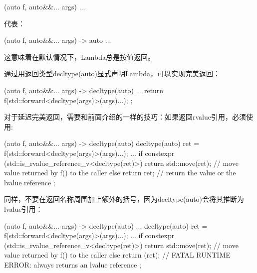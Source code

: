 \begin{cppcode}
[] (auto f, auto&&... args) {
	...
}
\end{cppcode}

代表：

\begin{cppcode}
[] (auto f, auto&&... args) -> auto {
	...
}
\end{cppcode}

这意味着在默认情况下，Lambda总是按值返回。

通过用返回类型decltype(auto)显式声明Lambda，可以实现完美返回：

\begin{cppcode}
[] (auto f, auto&&... args) -> decltype(auto) {
	...
	return f(std::forward<decltype(args)>(args)...);
};
\end{cppcode}

对于延迟完美返回，需要和前面介绍的一样的技巧：如果返回rvalue引用，必须使用:

\begin{cppcode}
[] (auto f, auto&&... args) -> decltype(auto) {
	decltype(auto) ret = f(std::forward<decltype(args)>(args)...);
	...
	if constexpr (std::is_rvalue_reference_v<decltype(ret)>) {
		return std::move(ret); // move value returned by f() to the caller
	}
	else {
		return ret; // return the value or the lvalue reference
	}
};
\end{cppcode}

同样，不要在返回名称周围加上额外的括号，因为decltype(auto)会将其推断为lvalue引用：

\begin{cppcode}
[] (auto f, auto&&... args) -> decltype(auto) {
	...
	decltype(auto) ret = f(std::forward<decltype(args)>(args)...);
	...
	if constexpr (std::is_rvalue_reference_v<decltype(ret)>) {
		return std::move(ret); // move value returned by f() to the caller
	}
	else {
		return (ret); // FATAL RUNTIME ERROR: always returns an lvalue reference
	}
};
\end{cppcode}










